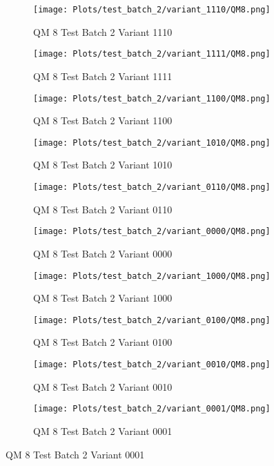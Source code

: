 \documentclass{DissertateFigs}
\begin{document}
\begin{figure}[t!]
    \begin{subfigure}{0.38\textwidth}
    \texttt{[image: Plots/test\_batch\_2/variant\_1110/QM8.png]}
    \caption{QM 8 Test Batch 2 Variant 1110}
    \end{subfigure}
    \begin{subfigure}{0.38\textwidth}
    \texttt{[image: Plots/test\_batch\_2/variant\_1111/QM8.png]}
    \caption{QM 8 Test Batch 2 Variant 1111}
    \end{subfigure}

\medskip

    \begin{subfigure}{0.38\textwidth}
    \texttt{[image: Plots/test\_batch\_2/variant\_1100/QM8.png]}
    \caption{QM 8 Test Batch 2 Variant 1100}
    \end{subfigure}
    \begin{subfigure}{0.38\textwidth}
    \texttt{[image: Plots/test\_batch\_2/variant\_1010/QM8.png]}
    \caption{QM 8 Test Batch 2 Variant 1010}
    \end{subfigure}

\medskip

    \begin{subfigure}{0.38\textwidth}
    \texttt{[image: Plots/test\_batch\_2/variant\_0110/QM8.png]}
    \caption{QM 8 Test Batch 2 Variant 0110}
    \end{subfigure}
    \begin{subfigure}{0.38\textwidth}
    \texttt{[image: Plots/test\_batch\_2/variant\_0000/QM8.png]}
    \caption{QM 8 Test Batch 2 Variant 0000}
    \end{subfigure}

\medskip

    \begin{subfigure}{0.38\textwidth}
    \texttt{[image: Plots/test\_batch\_2/variant\_1000/QM8.png]}
    \caption{QM 8 Test Batch 2 Variant 1000}
    \end{subfigure}
    \begin{subfigure}{0.38\textwidth}
    \texttt{[image: Plots/test\_batch\_2/variant\_0100/QM8.png]}
    \caption{QM 8 Test Batch 2 Variant 0100}
    \end{subfigure}

\medskip

    \begin{subfigure}{0.38\textwidth}
    \texttt{[image: Plots/test\_batch\_2/variant\_0010/QM8.png]}
    \caption{QM 8 Test Batch 2 Variant 0010}
    \end{subfigure}
    \begin{subfigure}{0.38\textwidth}
    \texttt{[image: Plots/test\_batch\_2/variant\_0001/QM8.png]}
    \caption{QM 8 Test Batch 2 Variant 0001}
    \end{subfigure}


\end{figure}
\end{document}
